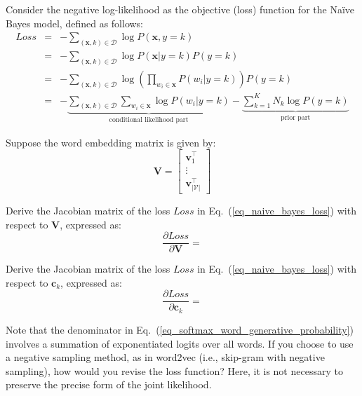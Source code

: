 \begin{parts}
    Consider the negative log-likelihood as the objective (loss) function for the Naïve Bayes model, defined as follows:
\begin{eqnarray}
    Loss &=& - \sum_{ ({\mathbf{x}}, k)\in {\mathcal{D}}} \log P\left ({\mathbf{x},y=k} \right) \nonumber \\
    &=& - \sum_{ ({\mathbf{x}},k)\in {\mathcal{D}}} \log P\left ({\mathbf{x}}|y=k \right) P(y=k) \nonumber \\
    &=& - \sum_{ ({\mathbf{x}}, k)\in {\mathcal{D}}} \log \left( \prod_{ w_i \in {\mathbf{x}}} P(w_i|y=k) \right) P(y=k) \nonumber \\
    &=& - \underbrace{\sum_{ ({\mathbf{x}}, k)\in {\mathcal{D}}} \sum_{ w_i \in {\mathbf{x}}} \log P(w_i|y=k) }_{\mbox{conditional likelihood part}}
    -  \underbrace{\sum_{k=1}^{K} N_k  \log P(y=k)}_{\mbox{prior part}} 
    \label{eq_naive_bayes_loss}
\end{eqnarray}

    \begin{subparts}
\subpart[8] Suppose the word embedding matrix is given by:
\begin{equation}    
\mathbf{V} = 
\begin{bmatrix}
\mathbf{v}_1^{\top} \\
\vdots \\
\mathbf{v}_{|\mathcal{V}|}^{\top}
\end{bmatrix}
\end{equation}


Derive the Jacobian matrix of the loss $\mathit{Loss}$ in Eq.~(\ref{eq_naive_bayes_loss}) with respect to $\mathbf{V}$, expressed as:
\begin{equation}
    \frac{\partial Loss}{\partial {\mathbf{V}} } = 
\end{equation}


\subpart[5]
Derive the Jacobian matrix of the loss $\mathit{Loss}$ in Eq.~(\ref{eq_naive_bayes_loss}) with respect to ${\mathbf{c}}_k$, expressed as:
\begin{equation}
    \frac{\partial Loss}{\partial {\mathbf{c}}_k } = 
\end{equation}


\subpart[8]
Note that the denominator in Eq.~(\ref{eq_softmax_word_generative_probability}) involves a summation of exponentiated logits over all words.
If you choose to use a negative sampling method, as in word2vec (i.e., skip-gram with negative sampling), how would you revise the loss function?
Here, it is not necessary to preserve the precise form of the joint likelihood.

    \end{subparts}
\end{parts}
